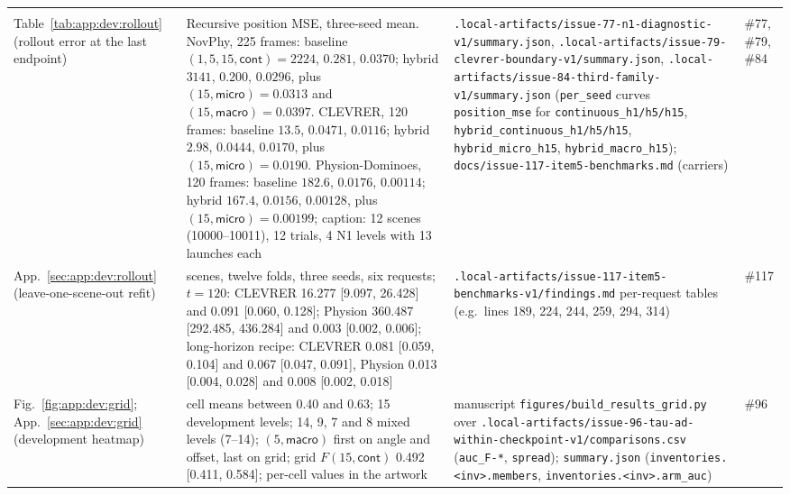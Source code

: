 {\begin{revblock}
\begin{longtable}{@{}>{\raggedright\arraybackslash}p{}>{\raggedright\arraybackslash}p{}>{\raggedright\arraybackslash}p{}>{\raggedright\arraybackslash}p{}@{}}
\multicolumn{4}{@{}l}{\emph{Submitted-checkpoint evidence (Appendix~\ref{sec:app:development})}} \\
Table~\ref{tab:app:dev:rollout} (rollout error at the last endpoint) & {\color{black}Recursive position MSE, three-seed mean. NovPhy, 225 frames: baseline $(1,5,15,\textsf{cont}) = 2224$, $0.281$, $0.0370$; hybrid $3141$, $0.200$, $0.0296$, plus $(15,\textsf{micro}) = 0.0313$ and $(15,\textsf{macro}) = 0.0397$. CLEVRER, 120 frames: baseline $13.5$, $0.0471$, $0.0116$; hybrid $2.98$, $0.0444$, $0.0170$, plus $(15,\textsf{micro}) = 0.0190$. Physion-Dominoes, 120 frames: baseline $182.6$, $0.0176$, $0.00114$; hybrid $167.4$, $0.0156$, $0.00128$, plus $(15,\textsf{micro}) = 0.00199$}; caption: 12 scenes (10000--10011), 12 trials, 4 N1 levels with 13 launches each & {\color{black}\nolinkurl{.local-artifacts/issue-77-n1-diagnostic-v1/summary.json}, \nolinkurl{.local-artifacts/issue-79-clevrer-boundary-v1/summary.json}, \nolinkurl{.local-artifacts/issue-84-third-family-v1/summary.json} (\texttt{per\_seed} curves \texttt{position\_mse} for \texttt{continuous\_h1/h5/h15}, \texttt{hybrid\_continuous\_h1/h5/h15}, \texttt{hybrid\_micro\_h15}, \texttt{hybrid\_macro\_h15})}; \nolinkurl{docs/issue-117-item5-benchmarks.md} (carriers) & {\color{black}\#77, \#79, \#84} \\
App.~\ref{sec:app:dev:rollout} (leave-one-scene-out refit) & 12 scenes, twelve folds, three seeds, six requests; $t=120$: CLEVRER 16.277 [9.097, 26.428] and 0.091 [0.060, 0.128]; Physion 360.487 [292.485, 436.284] and 0.003 [0.002, 0.006]; long-horizon recipe: CLEVRER 0.081 [0.059, 0.104] and 0.067 [0.047, 0.091], Physion 0.013 [0.004, 0.028] and 0.008 [0.002, 0.018] & \nolinkurl{.local-artifacts/issue-117-item5-benchmarks-v1/findings.md} per-request tables (e.g.\ lines 189, 224, 244, 259, 294, 314) & \#117 \\
Fig.~\ref{fig:app:dev:grid}; App.~\ref{sec:app:dev:grid} (development heatmap) & 36 cell means between 0.40 and 0.63; 15 development levels; 14, 9, 7 and 8 mixed levels (7--14); $(5,\textsf{macro})$ first on angle and offset, last on grid; grid $F(15,\textsf{cont})$ 0.492 [0.411, 0.584]; per-cell values in the artwork & manuscript \nolinkurl{figures/build_results_grid.py} over {\color{black}\nolinkurl{.local-artifacts/issue-96-tau-ad-within-checkpoint-v1/comparisons.csv} (\texttt{auc\_F-*}, \texttt{spread})}; \nolinkurl{summary.json} (\nolinkurl{inventories.<inv>.members}, \nolinkurl{inventories.<inv>.arm_auc}) & {\color{black}\#96} \\

\end{longtable}
\end{revblock}}
